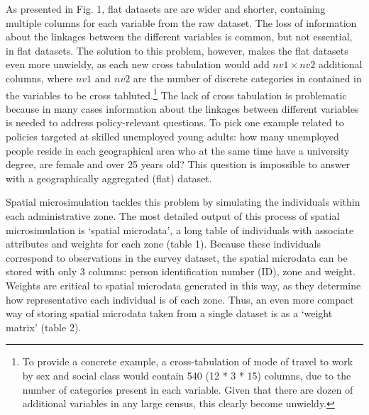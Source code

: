 \documentclass[a4paper,10pt]{article}
\begin{document}
As presented in Fig. 1, flat datasets are
are wider and shorter, containing multiple columns for each variable from the raw dataset.
The loss of information about the linkages between
the different variables is common, but not essential, in flat datasets. 
The solution to this problem, however, makes the flat datasets even more unwieldy, as
each new cross tabulation would add $nv1 \times nv2$ additional columns, where 
$nv1$ and $nv2$ are the number of discrete categories in contained in the variables to be
cross tabluted.\footnote{To 
provide a concrete example, a cross-tabulation 
of mode of travel to work by sex and social class would contain 540 (12 * 3 * 15) columns,
due to the number of categories present in each variable. 
Given that there are dozen of additional variables in any large census, this clearly become unwieldy.
} %
The lack of cross tabulation is problematic because 
in many cases information about the linkages between different variables is needed to 
address policy-relevant questions. To pick one example related to 
policies targeted at skilled unemployed young adults: how many unemployed people 
reside in each geographical area who at the same time have a university degree, 
are female and over 25 years old? This question is impossible to answer with a 
geographically aggregated (flat) dataset.

Spatial microsimulation tackles this problem by simulating
the individuals within each administrative zone. The most detailed output of this process of 
spatial microsimulation is `spatial microdata', a long table of individuals with 
associate attributes and weights for each zone (table 1). 
Because these individuals correspond to observations in the survey dataset,
the spatial microdata can be stored with only 3 columns: person identification number (ID), 
zone and weight. Weights are critical to spatial microdata generated in this way, as they 
determine how representative each individual is of each zone. Thus, an even more compact way 
of storing spatial microdata taken from a single dataset is as a `weight matrix' (table 2). 
\end{document}
